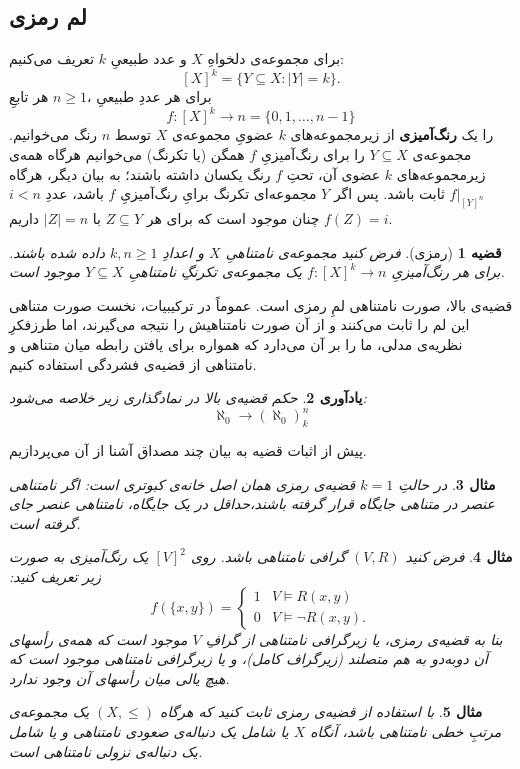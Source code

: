 \documentclass[12pt,a4paper]{report}
\theoremstyle{colorhead}
\newtheorem{thm}{قضیه}
\newtheorem{mesal}[thm]{مثال}
\newtheorem{yad}[thm]{یادآوری}
\begin{document}
\subsection{لم رمزی}
برای
مجموعه‌ی دلخواهِ
$X$ 
و عدد طبیعیِ
$k$
تعریف می‌کنیم:
\[
[X]^k=\{Y\subseteq X: |Y|=k\}.
\]
برای هر عددِ طبیعیِ
،$n\geq 1$ 
 هر تابعِ
\[
f:[X]^k\to n=\{0,1,\ldots,n-1\}
\]
را یک 
\textbf{رنگ‌آمیزی }
از زیرمجموعه‌های 
$k$
عضویِ مجموعه‌ی
$X$
توسط 
$n$
رنگ می‌خوانیم. 
مجموعه‌ی
$Y\subseteq X$
را برای رنگ‌آمیزیِ
$f$
همگن (یا تکرنگ)‌ می‌خوانیم هرگاه همه‌ی زیرمجموعه‌های
$k$
عضوی آن، تحتِ
$f$
رنگ یکسان داشته باشند؛ به بیان دیگر، هرگاه
$f|_{[Y]^n}$
ثابت باشد. پس اگر 
$Y$
مجموعه‌ای تکرنگ برایِ
رنگ‌آمیزیِ
$f$
باشد، عددِ
$i<n$
چنان موجود است که برای هر
$Z\subseteq Y$
با
$|Z|=n$
داریم
$f(Z)=i$.
\begin{thm}[رمزی]
فرض کنید مجموعه‌ی نامتناهیِ
$X$
و اعدادِ
$k,n\geq 1$
داده شده باشند.
برای 
هر رنگ‌آمیزیِ
$f:[X]^k\to n$
یک مجموعه‌ی تکرنگِ نامتناهیِ
$Y\subseteq X$
موجود است. 
\end{thm}
قضیه‌ی بالا، صورت نامتناهی لمِ رمزی است. عموماً در ترکیبیات، نخست صورت متناهی این لم را ثابت می‌کنند و از آن صورت نامتناهیش
را نتیجه‌ می‌گیرند، اما طرزفکرِ نظریه‌ی مدلی،  ما را بر آن می‌دارد که همواره برای یافتن رابطه میان متناهی و نامتناهی از قضیه‌ی فشردگی استفاده کنیم. 
\begin{yad}
حکم قضیه‌ی بالا در نمادگذاری زیر خلاصه می‌شود:
\[
\aleph_0\to (\aleph_0)^n_k
\]
\end{yad}
پیش از اثبات قضیه به بیان چند مصداق آشنا از آن می‌پردازیم.
\begin{mesal}
در حالتِ
$k=1$
قضیه‌ی رمزی همان اصل خانه‌ی کبوتری است: اگر نامتناهی عنصر در متناهی جایگاه قرار گرفته باشند،‌حداقل در یک جایگاه، نامتناهی عنصر جای گرفته است. 
\end{mesal}
\begin{mesal}
	فرض کنید
	$(V,R)$
	گرافی نامتناهی باشد. روی
	$[V]^2$
	یک رنگ‌آمیزی به صورت زیر تعریف کنید:
	\[
	f(\{x,y\})=
	\begin{cases}
1 & V\models R(x,y)	\\
0 & V\models \neg R(x,y).
	\end{cases}
	\]
	بنا به قضیه‌ی رمزی، یا زیرگرافی نامتناهی از گرافِ
	$V$
موجود است که همه‌ی رأسهای آن  دوبه‌دو به هم متصلند (زیرگراف کامل)، و یا زیرگرافی نامتناهی موجود است که هیچ یالی میان رأسهای آن 
وجود ندارد.
	\end{mesal}
\begin{mesal}
	با استفاده از قضیه‌ی رمزی ثابت کنید که هرگاه
	$(X,\leq)$
	یک مجموعه‌ی مرتبِ خطی نامتناهی باشد، آنگاه 
$X$
یا
شامل یک دنباله‌ی صعودی نامتناهی و یا شامل یک دنباله‌ی نزولی نامتناهی است.
	\end{mesal}
\end{document}
